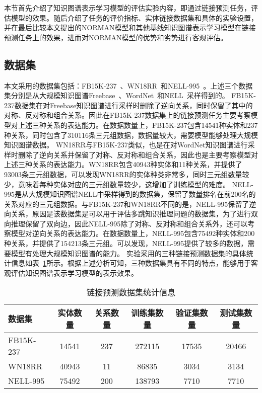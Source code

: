 \documentclass[algorithmlist, AutoFakeBold, AutoFakeSlant, figurelist, tablelist, nomlist, masters]{seuthesix}
\begin{document}
本节首先介绍了知识图谱表示学习模型的评估实验内容，即通过链接预测任务，评估模型的效果。随后介绍了任务的评价指标、实体链接数据集和具体的实验设置，并在最后比较本文提出的NORMAN模型和其他基线知识图谱表示学习模型在链接预测任务上的效果，进而对NORMAN模型的优势和劣势进行客观评估。

\subsection{数据集}
本文采用的数据集包括：FB15K-237~\cite{toutanova2015representing}、WN18RR~\cite{dettmers2018convolutional}和NELL-995~\cite{xiong2017deeppath}。上述三个数据集分别是从大规模知识图谱Freebase~\cite{bollacker2008freebase}、WordNet~\cite{glorot2010understanding}和NELL~\cite{carlson2010toward}采样得到的。
FB15K-237数据集在对Freebase知识图谱进行采样时删除了逆向关系，同时保留了其中的对称、反对称和组合关系。因此在FB15K-237数据集上的链接预测任务主要考察模型对上述三种关系的表达能力。在数据数量上，FB15K-237包含14541种实体和237种关系，同时包含了310116条三元组数据，数据量较大，需要模型能够处理大规模知识图谱数据。
WN18RR与FB15K-237类似，也是在对WordNet知识图谱进行采样时删除了逆向关系并保留了对称、反对称和组合关系，因此也是主要考察模型对上述三种关系的表达能力。WN18RR包含40943种实体和11种关系，并提供了93003条三元组数据，可以发现WN18RR的实体种类非常多，同时三元组数量较少，意味着每种实体对应的三元组数量较少，这增加了训练模型的难度。
NELL-995是从大规模知识图谱NELL中采样得到的数据集，保留了数量排名在前200名的关系对应的三元组数据。与FB15K-237和WN18RR不同的是，NELL-995保留了逆向关系，原因是该数据集是可以用于评估多跳知识推理问题的数据集，为了进行双向推理保留了双向边，因此NELL-995除了对称、反对称和组合关系外，还可以考察模型对逆向关系的表达能力。在数据数量上，NELL-995包含75492种实体和200种关系，并提供了154213条三元组。可以发现，NELL-995提供了较多的数据，需要模型有处理大规模知识图谱的能力。
实验采用的三种链接预测数据集的具体统计信息如表~\ref{Datasets1}所示。根据上述分析可知，三种数据集具有不同的特点，能够用于客观评估知识图谱表示学习模型的表示效果。

\begin{table}
  \centering
  \begin{tabular*}{0.95\textwidth}{@{\extracolsep{\fill}}lccccc}
		\toprule[1pt]
    数据集 & 实体数量 & 关系数量 & 训练集数量 & 验证集数量 & 测试集数量 \\ \hline
    FB15K-237 & 14541 & 237 & 272115 & 17535 & 20466\\
    WN18RR & 40943 & 11 & 86835 & 3034 & 3134\\
    NELL-995 & 75492 & 200 & 138793 & 7710 & 7710\\
		\bottomrule[1pt]
	\end{tabular*}
  \caption{链接预测数据集统计信息}
  \label{Datasets1}
\end{table}
\end{document}
